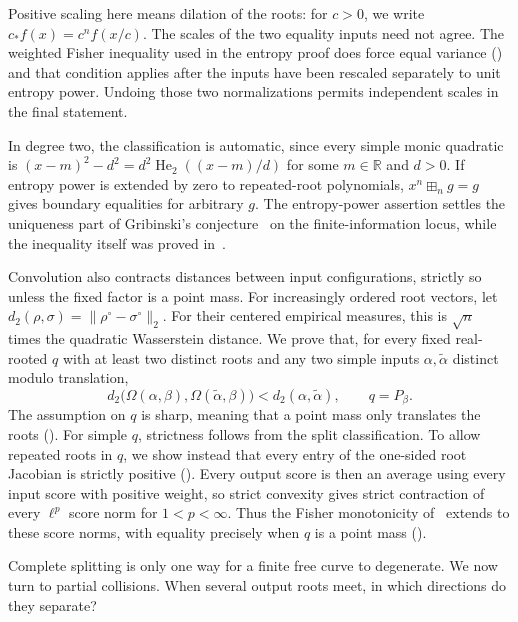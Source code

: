 \documentclass[12pt,reqno]{amsart}
\theoremstyle{definition}
\theoremstyle{remark}
\newcommand{\R}{\mathbb R}
\newcommand{\He}{\operatorname{He}}
\begin{document}
Positive scaling here means dilation of the roots: for \(c>0\), we write
\(c_*f(x)=c^nf(x/c)\).  The scales of the two equality inputs need not
agree.  The weighted Fisher inequality used in the entropy proof does
force equal variance () and that condition applies after the inputs have been rescaled separately to unit entropy power. Undoing those two normalizations permits independent scales in the final statement.

In degree two, the classification is automatic, since every simple
monic quadratic is \((x-m)^2-d^2=d^2\He_2((x-m)/d)\) for some
\(m\in\R\) and \(d>0\).  If entropy power is extended by zero to repeated-root polynomials, \(x^n\boxplus_n g=g\) gives boundary equalities for arbitrary \(g\). The entropy-power assertion settles the uniqueness part of Gribinski's conjecture~\cite[Conjecture~1]{Gribinski19} on the
finite-information locus, while the inequality itself was proved
in~\cite{GVS26}.

Convolution also contracts distances between input configurations,
strictly so unless the fixed factor is a point mass.  For increasingly
ordered root vectors, let
\(d_2(\rho,\sigma)=\|\rho^\circ-\sigma^\circ\|_2\).
For their centered empirical measures, this is \(\sqrt n\) times the
quadratic Wasserstein distance.  We prove that, for every fixed real-rooted
\(q\) with at least two distinct roots and any two simple inputs
\(\alpha,\widetilde\alpha\) distinct modulo translation,
\begin{equation}\label{eq:intro-strict-W2}
 d_2\bigl(\Omega(\alpha,\beta),
          \Omega(\widetilde\alpha,\beta)\bigr)
       <d_2(\alpha,\widetilde\alpha),\qquad q=P_\beta.
\end{equation}
The assumption on \(q\) is sharp, meaning that a point mass only translates the roots ().
For simple \(q\), strictness follows from the split classification.
To allow repeated roots in \(q\), we show instead that every entry of
the one-sided root Jacobian is strictly positive
().  Every output score is then an
average using every input score with positive weight, so strict convexity
gives strict contraction of every \(\ell^p\) score norm for
\(1<p<\infty\).  Thus the Fisher monotonicity of~\cite{GVS26}
extends to these score norms, with equality precisely when \(q\) is a
point mass ().

Complete splitting is only one way for a finite free curve to degenerate.
We now turn to partial collisions.  When several output roots meet, in
which directions do they separate?
\end{document}
